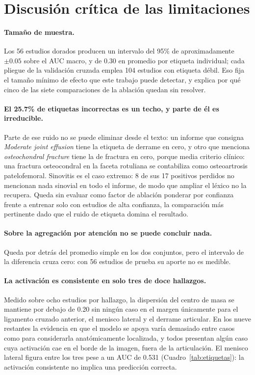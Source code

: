 \documentclass{article}
\begin{document}
\section{Discusión crítica de las limitaciones}

\paragraph{Tamaño de muestra.}
Los 56 estudios dorados producen un intervalo del 95\% de aproximadamente
$\pm0.05$ sobre el AUC macro, y de 0.30 en promedio por etiqueta individual; cada
pliegue de la validación cruzada emplea 104 estudios con etiqueta débil. Eso fija
el tamaño mínimo de efecto que este trabajo puede detectar, y explica por qué
cinco de las siete comparaciones de la ablación quedan sin resolver.

\paragraph{El 25.7\% de etiquetas incorrectas es un techo, y parte de él es irreducible.}
Parte de ese ruido no se puede eliminar desde el texto: un informe que consigna
\emph{Moderate joint effusion} tiene la etiqueta de derrame en cero, y otro que
menciona \emph{osteochondral fracture} tiene la de fractura en cero, porque media
criterio clínico: una fractura osteocondral en la faceta rotuliana se
contabiliza como osteoartrosis patelofemoral. Sinovitis es el caso extremo: 8 de sus 17 positivos
perdidos no mencionan nada sinovial en todo el informe, de modo que ampliar el
léxico no la recupera. Queda sin evaluar como factor de ablación ponderar por
confianza frente a entrenar solo con estudios de alta confianza, la comparación
más pertinente dado que el ruido de etiqueta domina el resultado.

\paragraph{Sobre la agregación por atención no se puede concluir nada.}
Queda por detrás del promedio simple en los dos conjuntos, pero el intervalo de
la diferencia cruza cero: con 56 estudios de prueba su aporte no es medible.

\paragraph{La activación es consistente en solo tres de doce hallazgos.}
Medido sobre ocho estudios por hallazgo, la dispersión del centro de masa se
mantiene por debajo de 0.20 sin ningún caso en el margen únicamente para el
ligamento cruzado anterior, el menisco lateral y el derrame articular. En los
nueve restantes la evidencia en que el modelo se apoya varía demasiado entre
casos como para considerarla anatómicamente localizada, y todos presentan algún
caso cuya activación cae en el borde de la imagen, fuera de la articulación. El
menisco lateral figura entre los tres pese a un AUC de 0.531
(Cuadro~\ref{tab:etiquetas}): la activación consistente no implica una predicción
correcta.
\end{document}
